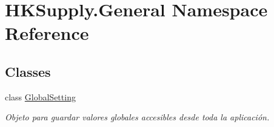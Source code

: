 \hypertarget{namespace_h_k_supply_1_1_general}{}\section{H\+K\+Supply.\+General Namespace Reference}
\label{namespace_h_k_supply_1_1_general}
\subsection*{Classes}
\begin{DoxyCompactItemize}
\item 
class \hyperlink{class_h_k_supply_1_1_general_1_1_global_setting}{Global\+Setting}
\begin{DoxyCompactList}\small\item\em Objeto para guardar valores globales accesibles desde toda la aplicación. \end{DoxyCompactList}\end{DoxyCompactItemize}
